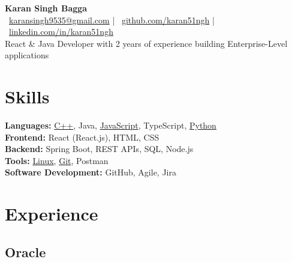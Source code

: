 \documentclass[a4paper,8pt]{article}
\newcommand{\linuxGitHub}{\href{https://github.com/karan51ngh/karan51ngh}{Linux}}
\newcommand{\gitGitHub}{\href{https://github.com/karan51ngh/gitCheatSheet}{Git}}
\newcommand{\jsGitHub}{\href{https://github.com/karan51ngh?tab=repositories&q=&type=&language=javascript}{JavaScript}}
\newcommand{\cppGitHub}{\href{https://github.com/karan51ngh/topicWiseQuestions}{C++}}
\newcommand{\pythonGitHub}{\href{https://github.com/karan51ngh?tab=repositories&q=&type=&language=python}{Python}}
\begin{document}
\begin{center}
  {\LARGE \textbf{Karan Singh Bagga}} \\
  \faEnvelope\ \href{mailto:karansingh9535@gmail.com}{karansingh9535@gmail.com} \quad | \quad
  \faGithub\ \href{https://github.com/karan51ngh}{github.com/karan51ngh} \quad | \quad
  \faLinkedin\ \href{https://linkedin.com/in/karan51ngh}{linkedin.com/in/karan51ngh} \\
  \vspace{0.2em}
  React \& Java Developer with 2 years of experience building Enterprise-Level applications
\end{center}


\section*{\faTools\hspace{0.5em}Skills}
\textbf{Languages:} \cppGitHub, {Java}, \jsGitHub, {TypeScript}, \pythonGitHub \\
\textbf{Frontend:} React (React.js), HTML, CSS \\
\textbf{Backend:} Spring Boot, REST APIs, SQL, Node.js\\
\textbf{Tools:} \linuxGitHub, \gitGitHub, Postman \\
\textbf{Software Development:} GitHub, Agile, Jira

\section*{\faBriefcase\hspace{0.5em}Experience}
\subsection*{Oracle }
\end{document}
